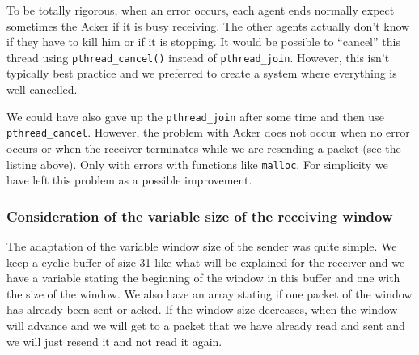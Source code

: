 \documentclass[10pt,a4paper]{article}
\begin{document}
To be totally rigorous, when an error occurs, each agent ends normally expect sometimes the Acker if it is busy receiving. The other agents actually don't know if they have to kill him or if it is stopping. It would be possible to ``cancel'' this thread using \lstinline|pthread_cancel()| instead of \lstinline|pthread_join|. However, this isn't typically best practice and we preferred to create a system where everything is well cancelled.

We could have also gave up the \lstinline|pthread_join| after some time and then use \lstinline|pthread_cancel|.
However, the problem with Acker does not occur when no error occurs or when the receiver terminates while we are resending a packet (see the listing above).
Only with errors with functions like \lstinline|malloc|. For simplicity we have left this problem as a possible improvement.

\subsubsection{Consideration of the variable size of the receiving window}
The adaptation of the variable window size of the sender was quite simple.
We keep a cyclic buffer of size 31 like what will be explained for the receiver and we have a variable stating the beginning of the window in this buffer and one with the size of the window.
We also have an array stating if one packet of the window has already been sent or acked.
If the window size decreases, when the window will advance and we will get to a packet that we have already read and sent and we will just resend it and not read it again.
\end{document}
